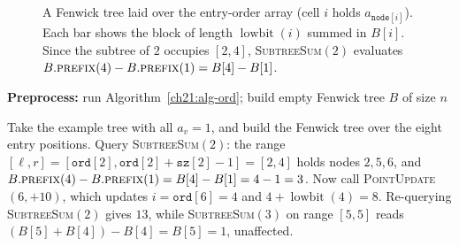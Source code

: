 \begin{figure}[htbp]
\centering
{}
\caption{A Fenwick tree laid over the entry-order array (cell $i$ holds $a_{\texttt{node}[i]}$). Each bar shows the block of length $\operatorname{lowbit}(i)$ summed in $B[i]$. Since the subtree of $2$ occupies $[2,4]$, \textsc{SubtreeSum}$(2)$ evaluates $B.\textsc{prefix}(4) - B.\textsc{prefix}(1) = B[4] - B[1]$.}
\label{ch21:fig-fenwick-subtree}
\end{figure}

\begin{algorithm}[H]
\caption{Subtree sum / point update over the Euler flattening}
\label{ch21:alg-subtreesum}
\DontPrintSemicolon
{}
\textbf{Preprocess:} run Algorithm~\ref{ch21:alg-ord}; build empty Fenwick tree $B$ of size $n$\;
\BlankLine
{}
\end{algorithm}

\begin{labbox}
Take the example tree with all $a_v=1$, and build the Fenwick tree over the eight entry
positions. Query \textsc{SubtreeSum}$(2)$: the range $[\ell, r] = [\texttt{ord}[2],\texttt{ord}[2]+
\texttt{sz}[2]-1]=[2,4]$ holds nodes $2,5,6$, and $B.\textsc{prefix}(4) - B.\textsc{prefix}(1) = B[4] - B[1] = 4 - 1 = 3$. Now call \textsc{PointUpdate}$(6,+10)$, which updates $i = \texttt{ord}[6] = 4$ and $4 + \operatorname{lowbit}(4) = 8$. Re-querying \textsc{SubtreeSum}$(2)$ gives $13$, while \textsc{SubtreeSum}$(3)$
on range $[5,5]$ reads $(B[5]+B[4]) - B[4] = B[5] = 1$, unaffected.
\end{labbox}

